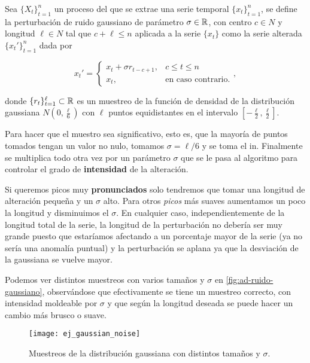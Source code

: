 \begin{definicion}
  Sea $\{X_t\}_{t = 1}^n$ un proceso del que se extrae una serie temporal $\{x_t\}_{t = 1}^n$, se define la perturbación de ruido gaussiano de parámetro $\sigma \in \mathbb{R}$, con centro $c \in N$ y longitud $\ell \in N$ tal que $c + \ell \leq n$ aplicada a la serie $\{x_t\}$ como la serie alterada $\{x_t'\}_{t = 1}^n$ dada por

  $$x_t' = \begin{cases}
    x_t + \sigma r_{t - c + 1}, & c \leq t \leq n \\
    x_t, & \text{en caso contrario.}
  \end{cases},$$

  donde $\{r_t\}_{t = 1}^\ell \subset \mathbb{R}$ es un muestreo de la función de densidad de la distribución gaussiana $N(0, \frac{\ell}{6})$ con $\ell$ puntos equidistantes en el intervalo $[-\frac{\ell}{2}, \frac{\ell}{2}]$.
  \label{def:ruido-gauss}
\end{definicion}

Para hacer que el muestro sea significativo, esto es, que la mayoría de puntos tomados tengan un valor no nulo, tomamos $\sigma = \ell / 6$ y se toma el in. Finalmente se multiplica todo otra vez por un parámetro $\sigma$ que se le pasa al algoritmo para controlar el grado de \textbf{intensidad} de la alteración.

Si queremos picos muy \textbf{pronunciados} solo tendremos que tomar una longitud de alteración pequeña y un $\sigma$ alto. Para otros \emph{picos} más suaves aumentamos un poco la longitud y disminuimos el $\sigma$. En cualquier caso, independientemente de la longitud total de la serie, la longitud de la perturbación no debería ser muy grande puesto que estaríamos afectando a un porcentaje mayor de la serie (ya no sería una anomalía puntual) y la perturbación se aplana ya que la desviación de la gaussiana se vuelve mayor.

Podemos ver distintos muestreos con varios tamaños y $\sigma$ en \autoref{fig:ad-ruido-gaussiano}, observándose que efectivamente se tiene un muestreo correcto, con intensidad moldeable por $\sigma$ y que según la longitud deseada se puede hacer un cambio más brusco o suave.

\begin{figure}[htpb]
  \centering
  \texttt{[image: ej\_gaussian\_noise]}
  \caption{Muestreos de la distribución gaussiana con distintos tamaños y $\sigma$.}
  \label{fig:ad-ruido-gaussiano}
\end{figure}

